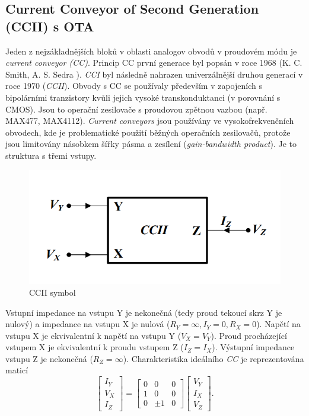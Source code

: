 \subsection{Current Conveyor of Second Generation (CCII) s OTA}
Jeden z nejzákladnějších bloků v oblasti analogov obvodů v proudovém módu je \textit{current conveyor (CC)}. Princip CC první generace byl popsán v roce 1968 (K. C. Smith, A. S. Sedra \cite{6}). \textit{CCI} byl následně nahrazen univerzálnější druhou generací v roce 1970 (\textit{CCII})\cite{7}. Obvody s CC se používaly především v zapojeních s bipolárními tranzistory kvůli jejich vysoké transkonduktanci (v porovnání s CMOS). Jsou to operační zesilovače s proudovou zpětnou vazbou (např. MAX477, MAX4112). \textit{Current conveyors} jsou používány ve vysokofrekvenčních obvodech, kde je problematické použití běžných operačních zesilovačů, protože jsou limitovány násobkem šířky pásma a zesílení (\textit{gain-bandwidth product}). Je to struktura s třemi vstupy.
\begin{figure}[h]
\centering
\includegraphics[scale=0.4]{ccii.png}
\caption[CCII symbol]{CCII symbol \cite{8}}
\end{figure}
\noindent Vstupní impedance na vstupu Y je nekonečná (tedy proud tekoucí skrz Y je nulový) a impedance na vstupu X je nulová ($R_Y = \infty, I_Y = 0, R_X = 0$). Napětí na vstupu X je ekvivalentní k napětí na vstupu Y ($V_X = V_Y$). Proud procházející vstupem X je ekvivalentní k proudu vstupem Z ($I_Z = I_X$). Výstupní impedance vstupu Z je nekonečná ($R_Z = \infty$).
Charakteristika ideálního \textit{CC} je reprezentována maticí
\begin{equation}
\begin{bmatrix}
I_Y \\ V_X \\ I_Z
\end{bmatrix}
=
\begin{bmatrix}
0 & 0 & 0 \\
1 & 0 & 0 \\
0 & \pm 1 & 0 
\end{bmatrix}
\begin{bmatrix}
V_Y \\
I_X \\
V_Z
\end{bmatrix}.
\end{equation}

